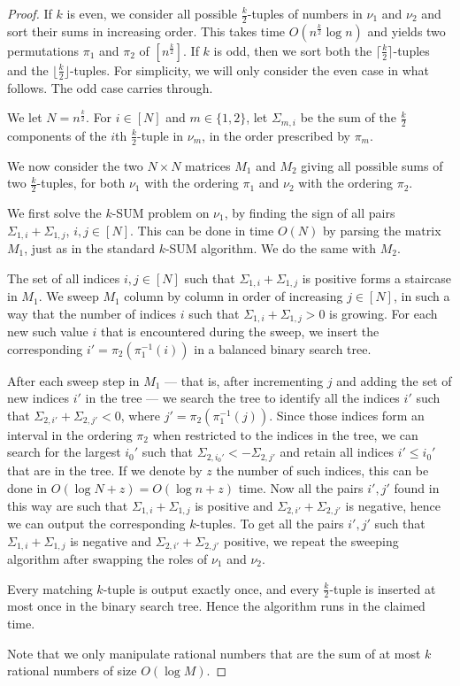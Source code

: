 \begin{proof}
	If $k$ is even, we consider all possible $\frac{k}{2}$-tuples of numbers in
	$\nu_1$ and $\nu_2$ and sort their sums in increasing order. This takes time
	$O(n^{\frac{k}{2}} \log n)$ and yields two permutations $\pi_1$ and $\pi_2$
	of $[n^\frac{k}{2}]$.
	If $k$ is odd, then we sort both the $\lceil\frac{k}{2}\rceil$-tuples and
	the $\lfloor\frac{k}{2}\rfloor$-tuples. For simplicity, we will only
	consider the even case in what follows. The odd case carries through.

	We let $N = n^\frac{k}{2}$. For $i \in [N]$ and $m \in \{1,2\}$, let
	$\Sigma_{m,i}$ be the sum of the $\frac{k}{2}$ components of the $i$th
	$\frac{k}{2}$-tuple in $\nu_m$, in the order prescribed by $\pi_m$.

	We now consider the two $N \times N$ matrices $M_1$ and $M_2$ giving all
	possible sums of two $\frac{k}{2}$-tuples, for both $\nu_1$ with the ordering
	$\pi_1$ and $\nu_2$ with the ordering $\pi_2$.

	We first solve the $k$-SUM problem on $\nu_1$, by finding the sign of all
	pairs $\Sigma_{1,i} + \Sigma_{1,j}$, $i, j \in [N]$. This can be done in
	time $O(N)$ by parsing the matrix $M_1$, just as in the standard \(k\)-SUM algorithm.
        We do the same with $M_2$.

	The set of all indices $i, j \in [N]$ such that $\Sigma_{1,i} +
	\Sigma_{1,j}$ is positive forms a staircase in $M_1$. We sweep $M_1$ column
	by column in order of increasing $j \in [N]$, in such a way that the number
	of indices $i$ such that $\Sigma_{1,i} + \Sigma_{1,j} > 0$ is growing.
	For each new such value $i$ that is encountered during the sweep, we insert
	the corresponding $i' = \pi_2(\pi_1^{-1}(i))$ in a balanced binary search
	tree.

	After each sweep step in $M_1$ --- that is, after incrementing $j$ and
	adding the set of new indices $i'$ in the tree --- we search the tree to
	identify all the indices $i'$ such that $\Sigma_{2,i'} + \Sigma_{2,j'} <
	0$, where $j' = \pi_2(\pi_1^{-1}(j))$. Since those indices form an interval
	in the ordering $\pi_2$ when restricted to the indices in the tree, we can
	search for the largest $i_0'$ such that $\Sigma_{2,i_0'} < -\Sigma_{2,j'}$
	and retain all indices $i' \le i_0'$ that are in the tree. If we denote by
	$z$ the number of such indices, this can be done in $O(\log N + z) = O(\log
	n + z)$ time. Now all the pairs $i', j'$ found in this way are such that
	$\Sigma_{1,i} + \Sigma_{1,j}$ is positive and $\Sigma_{2,i'} +
	\Sigma_{2,j'}$ is negative, hence we can output the corresponding
	$k$-tuples. To get all the pairs $i', j'$ such that
	$\Sigma_{1,i} + \Sigma_{1,j}$ is negative and $\Sigma_{2,i'} +
	\Sigma_{2,j'}$ positive, we repeat the sweeping algorithm after swapping the
	roles of $\nu_1$ and $\nu_2$.

	Every matching $k$-tuple is output exactly once, and every
	$\frac{k}{2}$-tuple is inserted at most once in the binary search tree.
	Hence the algorithm runs in the claimed time.

	Note that we only manipulate rational numbers that are the sum of at most
	$k$ rational numbers of size $O(\log M)$.
\end{proof}

